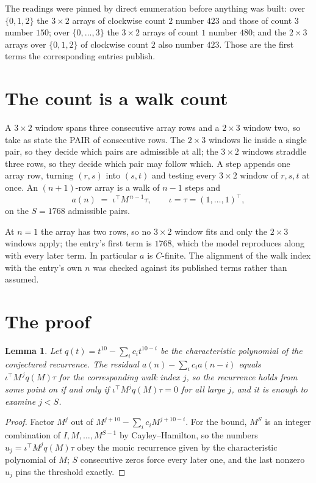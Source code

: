 \documentclass[11pt,a4paper]{article}
\theoremstyle{plain}
\newtheorem{lemma}[theorem]{Lemma}
\theoremstyle{definition}
\begin{document}
The readings were pinned by direct enumeration before anything was built: over
$\{0,1,2\}$ the $3\times2$ arrays of clockwise count $2$ number $423$ and those of count
$3$ number $150$; over $\{0,\dots,3\}$ the $3\times2$ arrays of count $1$ number $480$;
and the $2\times3$ arrays over $\{0,1,2\}$ of clockwise count $2$ also number $423$. Those
are the first terms the corresponding entries publish.

\section{The count is a walk count}

A $3\times2$ window spans three consecutive array rows and a $2\times3$
window two, so take as state the PAIR of consecutive rows. The $2\times3$ windows lie inside a
single pair, so they decide which pairs are admissible at all; the $3\times2$ windows straddle
three rows, so they decide which pair may follow which. A step appends one array row, turning
$(r,s)$ into $(s,t)$ and testing every $3\times2$ window of $r,s,t$ at once. An $(n+1)$-row
array is a walk of $n-1$ steps and
\[
a(n)\;=\;\iota^{\!\top}M^{\,n-1}\tau,\qquad\iota=\tau=(1,\dots,1)^{\!\top},
\]
on the $S=1768$ admissible pairs.

At $n=1$ the array has two rows, so no $3\times2$ window fits and only the
$2\times3$ windows apply; the entry's first term is
$1768$, which the model reproduces along with every later term.
In particular $a$ is $C$-finite. The alignment of the walk index with the entry's own $n$ was
checked against its published terms rather than assumed.

\section{The proof}

\begin{lemma}\label{lem:crit}
Let $q(t)=t^{10}-\sum_i c_it^{10-i}$ be the characteristic polynomial of the
conjectured recurrence. The residual $a(n)-\sum_ic_ia(n-i)$ equals
$\iota^{\!\top}M^{\,j}q(M)\tau$ for the corresponding walk index $j$, so the recurrence
holds from some point on if and only if $\iota^{\!\top}M^{j}q(M)\tau=0$ for all large $j$,
and it is enough to examine $j<S$.
\end{lemma}

\begin{proof}
Factor $M^{j}$ out of $M^{j+10}-\sum_ic_iM^{j+10-i}$. For the bound, $M^{S}$
is an integer combination of $I,M,\dots,M^{S-1}$ by Cayley--Hamilton, so the numbers
$u_j=\iota^{\!\top}M^{j}q(M)\tau$ obey the monic recurrence given by the characteristic
polynomial of $M$; $S$ consecutive zeros force every later one, and the last nonzero $u_j$
pins the threshold exactly.
\end{proof}
\end{document}
